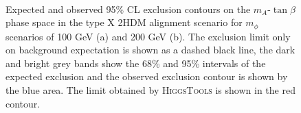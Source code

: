 \begin{figure}[!hbtp]
\centering
     \\
\caption{Expected and observed 95\% CL exclusion contours on the $m_{A}$-$\tan\beta$ phase space in the type X 2HDM alignment scenario for $m_{\phi}$ scenarios of 100 GeV (a) and 200 GeV (b). The exclusion limit only on background expectation is shown as a dashed black line, the dark and bright grey bands show the 68\% and 95\% intervals of the expected exclusion and the observed exclusion contour is shown by the blue area. The limit obtained by \textsc{HiggsTools} is shown in the red contour.}
\label{fig:4tau_md_hb}
\end{figure}

